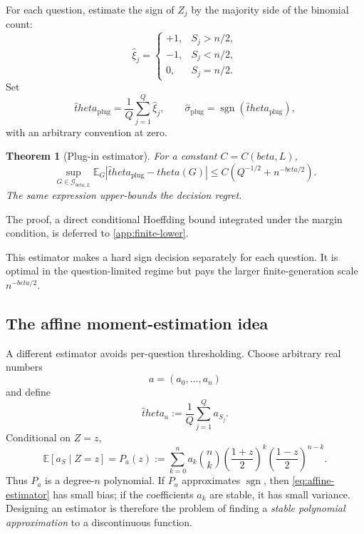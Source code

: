 \documentclass[11pt]{article}
\def\beta{beta}%
\def\theta{theta}%
\newtheorem{theorem}{Theorem}[section]
\newcommand{\E}{\mathbb E}
\newcommand{\sgn}{\operatorname{sgn}}
\newcommand{\calG}{\mathcal G}
\begin{document}
For each question, estimate the sign of $Z_j$ by the majority side of the binomial count:
\[
\widehat\xi_j
=
\begin{cases}
+1,&S_j>n/2,\\
-1,&S_j<n/2,\\
0,&S_j=n/2.
\end{cases}
\]
Set
\[
\widehat\theta_{\mathrm{plug}}
=
\frac1Q\sum_{j=1}^Q\widehat\xi_j,
\qquad
\widehat\sigma_{\mathrm{plug}}=\sgn(\widehat\theta_{\mathrm{plug}}),
\]
with an arbitrary convention at zero.

\begin{theorem}[Plug-in estimator]
\label{thm:plugin-scalar}
For a constant $C=C(\beta,L)$,
\begin{equation}
\label{eq:plugin-scalar}
\sup_{G\in\calG_{\beta,L}}
\E_G|\widehat\theta_{\mathrm{plug}}-\theta(G)|
\le
C\left(Q^{-1/2}+n^{-\beta/2}\right).
\end{equation}
The same expression upper-bounds the decision regret.
\end{theorem}
The proof, a direct conditional Hoeffding bound integrated under the margin condition, is deferred to \cref{app:finite-lower}.

This estimator makes a hard sign decision separately for each question.  It is optimal in the question-limited regime but pays the larger finite-generation scale $n^{-\beta/2}$.

\subsection{The affine moment-estimation idea}

A different estimator avoids per-question thresholding.  Choose arbitrary real numbers
\[
a=(a_0,\dots,a_n)
\]
and define
\begin{equation}
\label{eq:affine-estimator}
\widehat\theta_a
:=
\frac1Q\sum_{j=1}^Q a_{S_j}.
\end{equation}
Conditional on $Z=z$,
\begin{equation}
\label{eq:Pa}
\E[a_S\mid Z=z]
=
P_a(z)
:=
\sum_{k=0}^n a_k
\binom nk
\left(\frac{1+z}{2}\right)^k
\left(\frac{1-z}{2}\right)^{n-k}.
\end{equation}
Thus $P_a$ is a degree-$n$ polynomial.  If $P_a$ approximates $\sgn$, then \eqref{eq:affine-estimator} has small bias; if the coefficients $a_k$ are stable, it has small variance.  Designing an estimator is therefore the problem of finding a \emph{stable polynomial approximation} to a discontinuous function.
\end{document}

